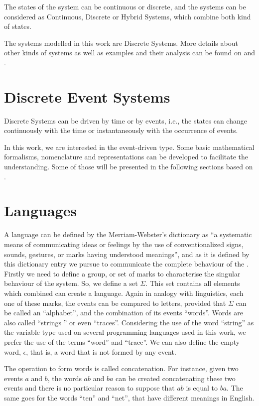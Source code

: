 The states of the system can be continuous or discrete, and the systems can be considered as Continuous, Discrete or 
Hybrid Systems, which combine both kind of states.

The systems modelled in this work are Discrete Systems. More details about other
kinds of systems as well as examples and their analysis can be found on
\cite{oppenheim1996signals} and \cite{kalouptsidis1997signal}.
\section{Discrete Event Systems}
\label{sec:discreteEventSystems}
Discrete Systems can be driven by time or by events, i.e., the states can
change continuously with the time or instantaneously with the occurrence of events.

In this work, we are interested in the event-driven type. Some basic mathematical
formalisms, nomenclature and representations can be developed to facilitate the
understanding. Some of those will be presented in the following sections based
on \cite{cassandras2009introduction, david2005discrete,david1989grafcet}.
\section{Languages} \label{sec:automata} A language can be defined by the Merriam-Webster's dictionary as ``a systematic
means of communicating ideas or feelings by the use of conventionalized signs,
sounds, gestures, or marks having understood meanings'', and as it is defined by
this dictionary entry we pursue to communicate the complete behaviour of the
\DES. Firstly we need to define a group, or set of marks to characterise the
singular behaviour of the system. So, we define a set $\Sigma$. This set contains
all elements which combined can create a language. Again in analogy with
linguistics, each one of these marks, the events can be compared to letters,
provided that $\Sigma$ can be called an ``alphabet'', and the combination of its
events ``words''. Words are also called ``strings '' or even ``traces''.
Considering the use of the word ``string'' as the variable type used on several
programming languages used in this work, we prefer the use of the terms
``word'' and ``trace''. We can also define the empty word,
$\epsilon$, that is, a word that is not formed by any event.

The operation to form words is called concatenation. For instance,
given two events $a$ and $b$, the words $ab$ and $ba$ can be created
concatenating these two events and there is no particular reason to suppose that
$ab$ is equal to $ba$. The same goes for the words ``ten'' and ``net'', that have different meanings in English.

